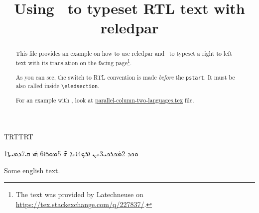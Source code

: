 \documentclass{article}
\newcommand{\textsyriac}[1] %
             {\bgroup\textdir TRT\syriacfont #1\egroup}
\newenvironment{syriac}     %
             {\textdir TRT\pardir TRT\syriacfont}{}
\renewcommand{\textsyriac}[1]{\bgroup\syriacfont #1\egroup}
\begin{document}
\date{}
\title{Using \LuaLaTeX\ to typeset RTL text with reledpar}
\maketitle
\begin{abstract}
This file provides an example on how to use  reledpar and \LuaLaTeX\ to typeset a right to left text with its translation on the facing page\footnote{The text was provided by Latechneuse on \url{https://tex.stackexchange.com/q/227837/}.}.  

As you can see, the switch to RTL convention is made \emph{before} the \verb+pstart+.
It must be also called inside \verb+\eledsection+.

For an example with \XeLaTeX, look at \href{./parallel-column-two-languages.tex}{parallel-column-two-languages.tex} file.
\end{abstract}

\begin{pages}
\begin{Leftside}
\begin{syriac}
\beginnumbering
   \pstart
       \eledsection*{\textsyriac{ܡܿܟܪܟܝ}}
   \pend

   \pstart
        1ܘܟܕ 2ܡܿܟܪܟܝ3ܢܢ ܐܪܟ4ܐܢܐ ܗ̄ 5ܡܘܪܐ6 ܗܿܝ ܩ7ܕܡܝܬܐ
   \pend
\endnumbering
\end{syriac}
\end{Leftside}

\begin{Rightside}
\beginnumbering
   \pstart
   \pend

   \pstart
        Some english text. 
   \pend
\endnumbering
\end{Rightside}

\end{pages} 
\Pages
\end{document}
